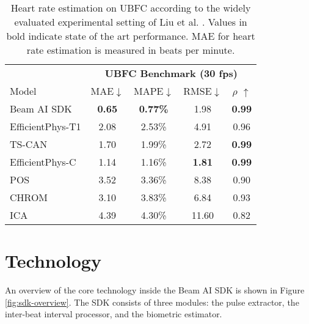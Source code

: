 \documentclass{article}
\begin{document}
\begin{table}[t]
    \centering
    \tabcolsep=0.67cm
    \begin{tabular}{lcccc}
        {} & \multicolumn{4}{c}{\textbf{UBFC Benchmark (30 fps)}} \\
        Model & MAE$\downarrow$ & MAPE$\downarrow$ & RMSE$\downarrow$ & $\rho$ $\uparrow$ \\
        \midrule
        Beam AI SDK & \textbf{0.65} & \textbf{0.77\%} & 1.98 & \textbf{0.99} \\
        \midrule
        EfficientPhys-T1 \cite{EfficientPhys_Liu2021} & 2.08 & 2.53\% & 4.91 & 0.96 \\
        TS-CAN \cite{TSCAN_Liu2020} & 1.70 & 1.99\% & 2.72 & \textbf{0.99} \\
        EfficientPhys-C \cite{EfficientPhys_Liu2021} & 1.14 & 1.16\% & \textbf{1.81} & \textbf{0.99} \\
        POS \cite{POS_Wang2016} & 3.52 & 3.36\% & 8.38 & 0.90 \\
        CHROM \cite{CHROM_DeHaan2013} & 3.10 & 3.83\% & 6.84 & 0.93 \\
        ICA \cite{ICA_Poh2011} & 4.39 & 4.30\% & 11.60 & 0.82 \\
    \end{tabular}
    \vspace{0.05in}
    \caption{Heart rate estimation on UBFC \cite{Bobbia17_UBFC} according to the widely evaluated experimental setting of Liu et al. \cite{TSCAN_Liu2020, MetaPhys_Liu2021, EfficientPhys_Liu2021}. Values in bold indicate state of the art performance. MAE for heart rate estimation is measured in beats per minute.}
    \label{tab:liu-eval-ubfc}
    \vspace{-0.2in}
\end{table}

\section{Technology}
\label{sec:technology}

An overview of the core technology inside the Beam AI SDK is shown in Figure \ref{fig:sdk-overview}. The SDK consists of three modules: the pulse extractor, the inter-beat interval processor, and the biometric estimator.
\end{document}

